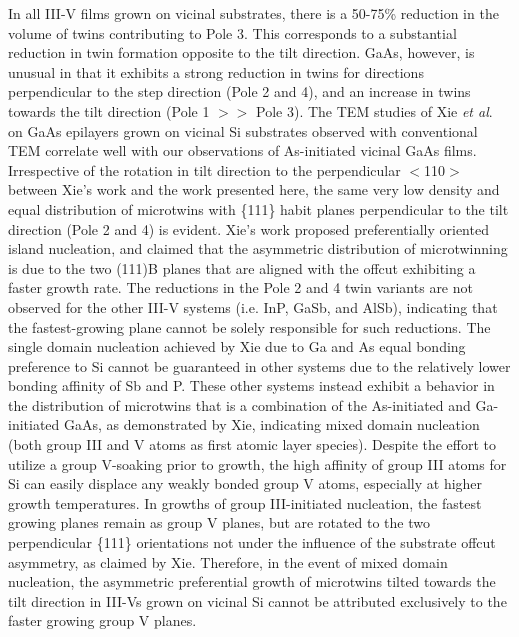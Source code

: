 In all III-V films grown on vicinal substrates, there is a 50-75\% reduction in the volume of twins contributing to Pole 3. This corresponds to a substantial reduction in twin formation opposite to the tilt direction. GaAs, however, is unusual in that it exhibits a strong reduction in twins for directions perpendicular to the step direction (Pole 2 and 4), and an increase in twins towards the tilt direction (Pole 1 $>>$ Pole 3). The TEM studies of Xie \textit{et al}.\cite{Xie1990} on GaAs epilayers grown on vicinal Si substrates observed with conventional TEM correlate well with our observations of As-initiated vicinal GaAs films. Irrespective of the rotation in tilt direction to the perpendicular $<$110$>$ between Xie's work and the work presented here, the same very low density and equal distribution of microtwins with \{111\} habit planes perpendicular to the tilt direction (Pole 2 and 4) is evident. Xie's work proposed preferentially oriented island nucleation, and claimed that the asymmetric distribution of microtwinning is due to the two (111)B planes that are aligned with the offcut exhibiting a faster growth rate. The reductions in the Pole 2 and 4 twin variants are not observed for the other III-V systems (i.e. InP, GaSb, and AlSb), indicating that the fastest-growing plane cannot be solely responsible for such reductions. The single domain nucleation achieved by Xie due to Ga and As equal bonding preference to Si\cite{Bringans1988} cannot be guaranteed in other systems due to the relatively lower bonding affinity of Sb\cite{Kubiak1985} and P\cite{Kiyota2001}. These other systems instead exhibit a behavior in the distribution of microtwins that is a combination of the As-initiated and Ga-initiated GaAs, as demonstrated by Xie, indicating mixed domain nucleation (both group III and V atoms as first atomic layer species). Despite the effort to utilize a group V-soaking prior to growth, the high affinity of group III atoms for Si can easily displace any weakly bonded group V atoms, especially at higher growth temperatures. In growths of group III-initiated nucleation, the fastest growing planes remain as group V planes, but are rotated to the two perpendicular \{111\} orientations not under the influence of the substrate offcut asymmetry, as claimed by Xie. Therefore, in the event of mixed domain nucleation, the asymmetric preferential growth of microtwins tilted towards the tilt direction in III-Vs grown on vicinal Si cannot be attributed exclusively to the faster growing group V planes.

